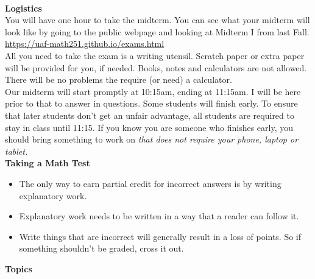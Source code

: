 \documentclass[11pt,fleqn]{article}
\begin{document}
\renewcommand{\headrulewidth}{0pt}
\newcommand{\blank}[1]{\rule{#1}{0.75pt}}
\newcommand{\bc}{\begin{center}}
\newcommand{\ec}{\end{center}}
\renewcommand{\d}{\displaystyle}

\vspace*{-0.7in}

\begin{center}
  \large
  \\
\end{center}
\noindent\textbf{Logistics}\\

You will have one hour to take the midterm. You can see what your midterm will look like by going to the public webpage and looking at Midterm I from last Fall.\\

\url{https://uaf-math251.github.io/exams.html}\\

All you need to take the exam is a writing utensil. Scratch paper or extra paper will be provided for you, if needed. Books, notes and calculators are not allowed. There will be no problems the require (or need) a calculator. \\

Our midterm will start promptly at 10:15am, ending at 11:15am. I will be here prior to that to answer in questions. Some students will finish early. To ensure that later students don't get an unfair advantage, all students are required to stay in class until 11:15. If you know you are someone who finishes early, you should bring something to work on \emph{that does not require your phone, laptop or tablet.}\\

\noindent\textbf{Taking a Math Test}\\

\begin{itemize}
\item The only way to earn partial credit for incorrect answers is by writing explanatory work.
\item Explanatory work needs to be written in a way that a reader can follow it.
\item Write things that are incorrect will generally result in a loss of points. So if something shouldn't be graded, cross it out.
\end{itemize}


\noindent\textbf{Topics}\\
\end{document}
